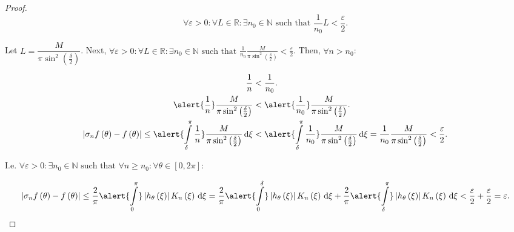 \begin{frame}[allowframebreaks]
\begin{proof}
		\begin{equation*}
			\forall\varepsilon>0:
			\forall L\in\mathds{R}:
			\exists n_{0}\in\mathds{N}
			\text{ such that }
			\frac{1}{n_{0}}L<
			\frac{\varepsilon}{2}.
		\end{equation*}

		Let
		\begin{math}
			L=
			\dfrac{
				M
			}{
				\pi\sin^{2}\left(\frac{\delta}{2}\right)
			}
		\end{math}.
		Next,
		\begin{math}
			\displaystyle
			\forall\varepsilon>0:
			\forall L\in\mathds{R}:
			\exists n_{0}\in\mathds{N}
			\text{ such that }
			\frac{1}{n_{0}}
			\frac{
				M
			}{\pi\sin^{2}\left(\frac{\delta}{2}\right)}
			<\frac{\varepsilon}{2}
		\end{math}.
		Then, $\forall n>n_{0}$:

		\framebreak

		\begin{align*}
			\frac{1}{n}                                 & <
			\frac{1}{n_{0}}.                                \\
			\alert{\frac{1}{n}}
			\frac{
				M
			}{\pi\sin^{2}\left(\frac{\delta}{2}\right)} & <
			\alert{\frac{1}{n_{0}}}
			\frac{
				M
			}{\pi\sin^{2}\left(\frac{\delta}{2}\right)}.    \\
			\left|
			\sigma_{n}f\left(\theta\right)-
			f\left(\theta\right)
			\right|\leq
			\alert{
				\int\limits_{\delta}^{\pi}
				\frac{1}{n}
			}
			\frac{
				M
			}{
				\pi\sin^{2}\left(\frac{\delta}{2}\right)
			}
			\dl\xi
			                                            & <
			\alert{
				\int\limits_{\delta}^{\pi}
				\frac{1}{n_{0}}
			}
			\frac{
				M
			}{\pi\sin^{2}\left(\frac{\delta}{2}\right)}
			\dl\xi=
			\frac{1}{n_{0}}
			\frac{
				M
			}{\pi\sin^{2}\left(\frac{\delta}{2}\right)}
			<\frac{\varepsilon}{2}.
		\end{align*}

		I.e.
		\begin{math}
			\forall\varepsilon>0:
			\exists n_{0}\in\mathds{N}
			\text{ such that }
			\forall n\geq n_{0}:
			\forall\theta\in\left[0,2\pi\right]:
		\end{math}

		\begin{equation*}
			\left|
			\sigma_{n}f\left(\theta\right)-
			f\left(\theta\right)
			\right|
			\leq
			\frac{2}{\pi}
			\alert{\int\limits_{0}^{\pi}}
			\left|
			h_{\theta}\left(\xi\right)
			\right|
			K_{n}\left(\xi\right)
			\dl\xi
			=
			\frac{2}{\pi}
			\alert{\int\limits_{0}^{\delta}}
			\left|
			h_{\theta}\left(\xi\right)
			\right|
			K_{n}\left(\xi\right)
			\dl\xi
			+
			\frac{2}{\pi}
			\alert{\int\limits_{\delta}^{\pi}}
			\left|
			h_{\theta}\left(\xi\right)
			\right|
			K_{n}\left(\xi\right)
			\dl\xi
			<\frac{\varepsilon}{2}+
			\frac{\varepsilon}{2}=
			\varepsilon.
		\end{equation*}
	\end{proof}
\end{frame}